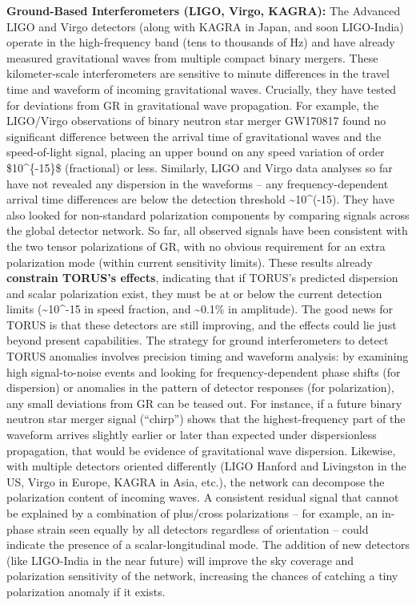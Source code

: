 \documentclass[
]{article}
\begin{document}
{\textbf{Ground-Based Interferometers (LIGO, Virgo, KAGRA):} The Advanced
LIGO and Virgo detectors (along with KAGRA in Japan, and soon
LIGO-India) operate in the high-frequency band (tens to thousands of Hz)
and have already measured gravitational waves from multiple compact
binary mergers. These kilometer-scale interferometers are sensitive to
minute differences in the travel time and waveform of incoming
gravitational waves. Crucially, they have tested for deviations from GR
in gravitational wave propagation. For example, the LIGO/Virgo
observations of binary neutron star merger GW170817 found no significant
difference between the arrival time of gravitational waves and the
speed-of-light signal, placing an upper bound on any speed variation of
order \$10\^{}\{-15\}\$ (fractional) or less\hspace{0pt}. Similarly,
LIGO and Virgo data analyses so far have not revealed any dispersion in
the waveforms -- any frequency-dependent arrival time differences are
below the detection threshold \textasciitilde10\^{}(-15)\hspace{0pt}.
They have also looked for non-standard polarization components by
comparing signals across the global detector network. So far, all
observed signals have been consistent with the two tensor polarizations
of GR, with no obvious requirement for an extra polarization mode
(within current sensitivity limits). These results already
\textbf{constrain TORUS's effects}, indicating that if TORUS's predicted
dispersion and scalar polarization exist, they must be at or below the
current detection limits (\textasciitilde10\^{}-15 in speed fraction,
and \textasciitilde0.1\% in amplitude). The good news for TORUS is that
these detectors are still improving, and the effects could lie just
beyond present capabilities\hspace{0pt}. The strategy for ground
interferometers to detect TORUS anomalies involves precision timing and
waveform analysis: by examining high signal-to-noise events and looking
for frequency-dependent phase shifts (for dispersion) or anomalies in
the pattern of detector responses (for polarization), any small
deviations from GR can be teased out. For instance, if a future binary
neutron star merger signal (``chirp'') shows that the highest-frequency
part of the waveform arrives slightly earlier or later than expected
under dispersionless propagation, that would be evidence of
gravitational wave dispersion. Likewise, with multiple detectors
oriented differently (LIGO Hanford and Livingston in the US, Virgo in
Europe, KAGRA in Asia, etc.), the network can decompose the polarization
content of incoming waves. A consistent residual signal that cannot be
explained by a combination of plus/cross polarizations -- for example,
an in-phase strain seen equally by all detectors regardless of
orientation -- could indicate the presence of a scalar-longitudinal
mode. The addition of new detectors (like LIGO-India in the near future)
will improve the sky coverage and polarization sensitivity of the
network, increasing the chances of catching a tiny polarization anomaly
if it exists\hspace{0pt}.

}
\end{document}
